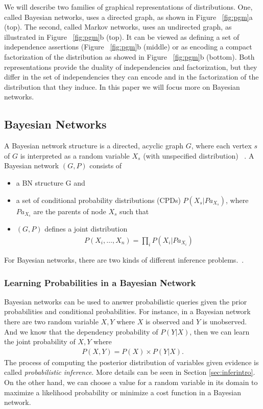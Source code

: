 We will describe two families of graphical representations of distributions. One, called Bayesian networks, uses a directed graph, as shown in Figure ~\ref{fig:pgm}a (top). The second, called Markov networks, uses an undirected graph, as illustrated in Figure ~\ref{fig:pgm}b (top). It can be viewed as defining a set of independence assertions (Figure ~\ref{fig:pgm}b (middle) or as encoding a compact factorization of the distribution as showed in Figure ~\ref{fig:pgm}b (bottom). Both representations provide the duality of independencies and factorization, but they differ in the set of independencies they can encode and in the factorization of the distribution that they induce. In this paper we will focus more on Bayesian networks.


\subsection{Bayesian Networks}
A Bayesian network structure is a directed, acyclic graph $G$, where each vertex $s$ of $G$ is interpreted as a random variable $X_s$ (with unspecified distribution) ~\cite{heckerman}.
A Bayesian network $(G, P)$ consists of
\begin{itemize}
  \item a BN structure G and
  \item a set of conditional probability distributions (CPDs) $P(X_s | Pa_{X_s})$, where $Pa_{X_s}$ are the parents of node $X_s$ such that 
  \item $(G, P)$ defines a joint distribution
  \begin{align*}
    P(X_i, \dots, X_n) = \prod_i P(X_i | Pa_{X_i})
  \end{align*}
\end{itemize}
For Bayesian networks, there are two kinds of different inference problems.~\cite{heckerman1998tutorial}.

\subsubsection{Learning Probabilities in a Bayesian Network}
Bayesian networks can be used to answer probabilistic queries given the prior probabilities and conditional probabilities. For instance, in a Bayesian network there are two random variable $X, Y$ where $X$ is observed and $Y$ is unobserved. And we know that the dependency probability of $P(Y | X)$, then we can learn the joint probability of $X, Y$ where 
\begin{align*}
  P(X, Y) = P(X) \times P(Y | X).
\end{align*}
The process of computing the posterior distribution of variables given evidence is called \textit{probabilistic inference}. More details can be seen in Section \ref{sec:inferintro}. On the other hand, we can choose a value for a random variable in its domain to maximize a likelihood probability or minimize a cost function in a Bayesian network. 

